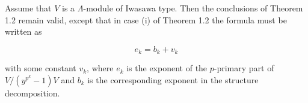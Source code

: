Assume that $V$ is a $\Lambda$-module of Iwasawa type. Then the conclusions of Theorem 1.2 remain valid, except that in case (i) of Theorem 1.2 the formula must be written as

$$e_k = b_k + v_k$$

with some constant $v_k$, where $e_k$ is the exponent of the $p$-primary part of $V/(y^{p^k}-1)V$ and $b_k$ is the corresponding exponent in the structure decomposition.
